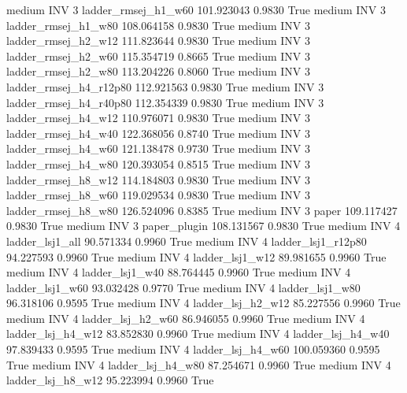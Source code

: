     medium      INV                 3    ladder_rmsej_h1_w60 101.923043      0.9830    True
    medium      INV                 3    ladder_rmsej_h1_w80 108.064158      0.9830    True
    medium      INV                 3    ladder_rmsej_h2_w12 111.823644      0.9830    True
    medium      INV                 3    ladder_rmsej_h2_w60 115.354719      0.8665    True
    medium      INV                 3    ladder_rmsej_h2_w80 113.204226      0.8060    True
    medium      INV                 3 ladder_rmsej_h4_r12p80 112.921563      0.9830    True
    medium      INV                 3 ladder_rmsej_h4_r40p80 112.354339      0.9830    True
    medium      INV                 3    ladder_rmsej_h4_w12 110.976071      0.9830    True
    medium      INV                 3    ladder_rmsej_h4_w40 122.368056      0.8740    True
    medium      INV                 3    ladder_rmsej_h4_w60 121.138478      0.9730    True
    medium      INV                 3    ladder_rmsej_h4_w80 120.393054      0.8515    True
    medium      INV                 3    ladder_rmsej_h8_w12 114.184803      0.9830    True
    medium      INV                 3    ladder_rmsej_h8_w60 119.029534      0.9830    True
    medium      INV                 3    ladder_rmsej_h8_w80 126.524096      0.8385    True
    medium      INV                 3                  paper 109.117427      0.9830    True
    medium      INV                 3           paper_plugin 108.131567      0.9830    True
    medium      INV                 4        ladder_lsj1_all  90.571334      0.9960    True
    medium      INV                 4     ladder_lsj1_r12p80  94.227593      0.9960    True
    medium      INV                 4        ladder_lsj1_w12  89.981655      0.9960    True
    medium      INV                 4        ladder_lsj1_w40  88.764445      0.9960    True
    medium      INV                 4        ladder_lsj1_w60  93.032428      0.9770    True
    medium      INV                 4        ladder_lsj1_w80  96.318106      0.9595    True
    medium      INV                 4      ladder_lsj_h2_w12  85.227556      0.9960    True
    medium      INV                 4      ladder_lsj_h2_w60  86.946055      0.9960    True
    medium      INV                 4      ladder_lsj_h4_w12  83.852830      0.9960    True
    medium      INV                 4      ladder_lsj_h4_w40  97.839433      0.9595    True
    medium      INV                 4      ladder_lsj_h4_w60 100.059360      0.9595    True
    medium      INV                 4      ladder_lsj_h4_w80  87.254671      0.9960    True
    medium      INV                 4      ladder_lsj_h8_w12  95.223994      0.9960    True
